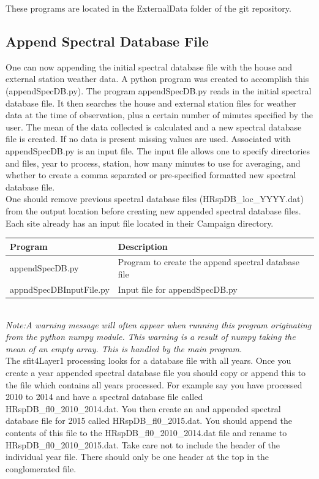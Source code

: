 \documentclass[12pt, letterpaper]{article}
\begin{document}
These programs are located in the ExternalData folder of the git repository.

\subsection{Append Spectral Database File}
\label{sec:ASDF}
One can now appending the initial spectral database file with the house and external station weather data. A python program was created to accomplish this (appendSpecDB.py). The program appendSpecDB.py reads in the initial spectral database file. It then searches the house and external station files for weather data at the time of observation, plus a certain number of minutes specified by the user. The mean of the data collected is calculated and a new spectral database file is created. If no data is present missing values are used. Associated with appendSpecDB.py is an input file. The input file allows one to specify directories and files, year to process, station, how many minutes to use for averaging, and whether to create a comma separated or pre-specified formatted new spectral database file.\\

One should remove previous spectral database files (HRspDB\_loc\_YYYY.dat) from the output location before creating new appended spectral database files.\\

Each site already has an input file located in their Campaign directory. \\

\begin{tabular}{ l l }
\textbf{Program} & \textbf{Description} \\
\hline
appendSpecDB.py         & Program to create the append spectral database file\\
appndSpecDBInputFile.py & Input file for appendSpecDB.py \\
\end{tabular} \\

\textit{Note:A warning message will often appear when running this program originating from the python numpy module. This warning is a result of numpy taking the mean of an empty array. This is handled by the main program.}\\

The sfit4Layer1 processing looks for a database file with all years. Once you create a year appended spectral database file you should copy or append this to the file which contains all years processed. For example say you have processed 2010 to 2014 and have a spectral database file called HRspDB\_fl0\_2010\_2014.dat. You then create an and appended spectral database file for 2015 called HRspDB\_fl0\_2015.dat. You should append the contents of this file to the HRspDB\_fl0\_2010\_2014.dat file and rename to HRspDB\_fl0\_2010\_2015.dat. Take care not to include the header of the individual year file. There should only be one header at the top in the conglomerated file.\\
\end{document}
